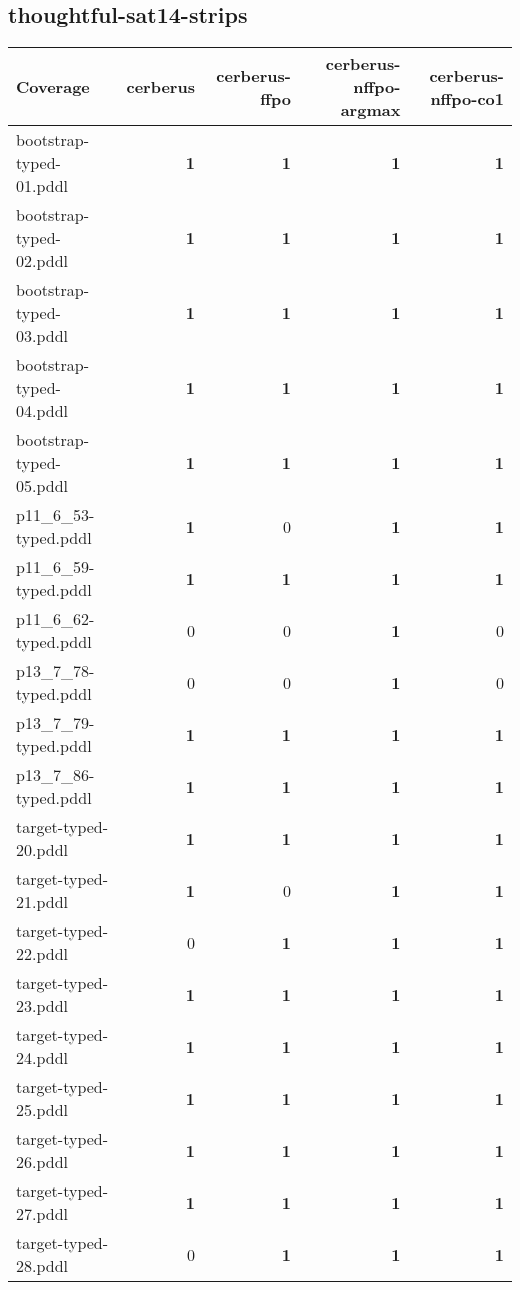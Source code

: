 \documentclass{article}
\begin{document}
\hypertarget{coverage-thoughtful-sat14-strips}{}
\subsection*{thoughtful-sat14-strips}

\begin{tabular}{@{}lrrrr@{}}
Coverage & cerberus & cerberus-ffpo & cerberus-nffpo-argmax & cerberus-nffpo-co1 \\
\midrule
bootstrap-typed-01.pddl & \textbf{1} & \textbf{1} & \textbf{1} & \textbf{1} \\
bootstrap-typed-02.pddl & \textbf{1} & \textbf{1} & \textbf{1} & \textbf{1} \\
bootstrap-typed-03.pddl & \textbf{1} & \textbf{1} & \textbf{1} & \textbf{1} \\
bootstrap-typed-04.pddl & \textbf{1} & \textbf{1} & \textbf{1} & \textbf{1} \\
bootstrap-typed-05.pddl & \textbf{1} & \textbf{1} & \textbf{1} & \textbf{1} \\
p11_6_53-typed.pddl & \textbf{1} & 0 & \textbf{1} & \textbf{1} \\
p11_6_59-typed.pddl & \textbf{1} & \textbf{1} & \textbf{1} & \textbf{1} \\
p11_6_62-typed.pddl & 0 & 0 & \textbf{1} & 0 \\
p13_7_78-typed.pddl & 0 & 0 & \textbf{1} & 0 \\
p13_7_79-typed.pddl & \textbf{1} & \textbf{1} & \textbf{1} & \textbf{1} \\
p13_7_86-typed.pddl & \textbf{1} & \textbf{1} & \textbf{1} & \textbf{1} \\
target-typed-20.pddl & \textbf{1} & \textbf{1} & \textbf{1} & \textbf{1} \\
target-typed-21.pddl & \textbf{1} & 0 & \textbf{1} & \textbf{1} \\
target-typed-22.pddl & 0 & \textbf{1} & \textbf{1} & \textbf{1} \\
target-typed-23.pddl & \textbf{1} & \textbf{1} & \textbf{1} & \textbf{1} \\
target-typed-24.pddl & \textbf{1} & \textbf{1} & \textbf{1} & \textbf{1} \\
target-typed-25.pddl & \textbf{1} & \textbf{1} & \textbf{1} & \textbf{1} \\
target-typed-26.pddl & \textbf{1} & \textbf{1} & \textbf{1} & \textbf{1} \\
target-typed-27.pddl & \textbf{1} & \textbf{1} & \textbf{1} & \textbf{1} \\
target-typed-28.pddl & 0 & \textbf{1} & \textbf{1} & \textbf{1} \\
\end{tabular}
\end{document}
